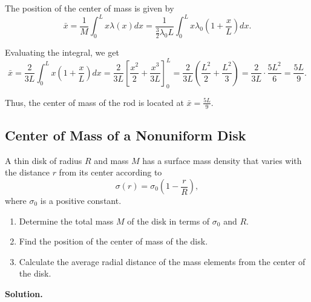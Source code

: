 \documentclass[12pt]{article}
\begin{document}
The position of the center of mass is given by
\begin{equation}
    \bar{x} = \frac{1}{M} \int_0^L x \lambda(x) dx = \frac{1}{\frac{3}{2} \lambda_0 L} \int_0^L x \lambda_0 \left(1 + \frac{x}{L}\right) dx.
\end{equation}

Evaluating the integral, we get
\begin{equation}
    \bar{x} = \frac{2}{3L} \int_0^L x \left(1 + \frac{x}{L}\right) dx = \frac{2}{3L} \left[ \frac{x^2}{2} + \frac{x^3}{3L} \right]_0^L = \frac{2}{3L} \left( \frac{L^2}{2} + \frac{L^2}{3} \right) = \frac{2}{3L} \cdot \frac{5L^2}{6} = \frac{5L}{9}.
\end{equation}

Thus, the center of mass of the rod is located at $\bar{x} = \frac{5L}{9}$.


\subsection{Center of Mass of a Nonuniform Disk}
A thin disk of radius $R$ and mass $M$ has a surface mass density
that varies with the distance $r$ from its center according to
\[
    \sigma(r) = \sigma_0 \left(1-\frac{r}{R}\right),
\]
where $\sigma_0$ is a positive constant.

\begin{enumerate}
    \item Determine the total mass $M$ of the disk in terms of
    $\sigma_0$ and $R$.
    \item Find the position of the center of mass of the disk.
    \item Calculate the average radial distance of the mass
    elements from the center of the disk.
\end{enumerate}

\textbf{Solution.}
\end{document}

